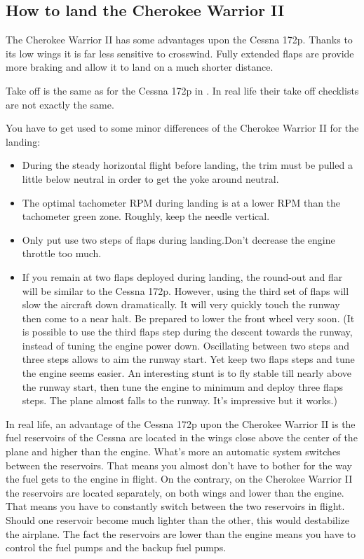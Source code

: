 \subsection{How to land the Cherokee Warrior II}
\label{sec:Cherokee}
    
The Cherokee Warrior II has some advantages upon the Cessna 172p. Thanks to its 
low wings it is far less sensitive to crosswind. Fully extended flaps are provide
more braking and allow it to land on a much shorter distance. 

Take off is the same as for the Cessna 172p in \FlightGear. In real life their 
take off checklists are not exactly the same. 

You have to get used to some minor differences of the Cherokee Warrior II for 
the landing:

\begin{itemize}
	\item During the steady horizontal flight before landing, the trim must be 
   pulled a little below neutral in order to get the yoke around neutral.
	\item The optimal tachometer RPM during landing is at a lower RPM than the 
  tachometer green zone. Roughly, keep the needle vertical.
	\item Only put use two steps of flaps during landing.Don't decrease the 
  engine throttle too much.
	\item If you remain at two flaps deployed during landing, the round-out and
  flar will be similar to the Cessna 172p. However, using the third set of 
  flaps will slow the aircraft down dramatically. It will very quickly touch 
  the runway then come to a near halt. Be prepared to lower the front wheel 
  very soon. (It is possible to use the third flaps step during the descent
  towards the runway, instead of tuning the engine power down. Oscillating 
  between two steps and three steps allows to aim the runway start. Yet keep 
  two flaps steps and tune the engine seems easier. An interesting stunt is to 
  fly stable till nearly above the runway start, then tune the engine to 
  minimum and deploy three flaps steps. The plane almost falls to the runway. 
  It's impressive but it works.)
\end{itemize}
    
In real life, an advantage of the Cessna 172p upon the Cherokee
Warrior II is the fuel reservoirs of the Cessna are located in the
wings close above the center of the plane and higher than the engine.
What's more an automatic system switches between the reservoirs. That
means you almost don't have to bother for the way the fuel gets to the
engine in flight. On the contrary, on the Cherokee Warrior II the
reservoirs are located separately, on both wings and lower than the
engine. That means you have to constantly switch between the two
reservoirs in flight. Should one reservoir become much lighter than the
other, this would destabilize the airplane. The fact the reservoirs are
lower than the engine means you have to control the fuel pumps and the
backup fuel pumps.

